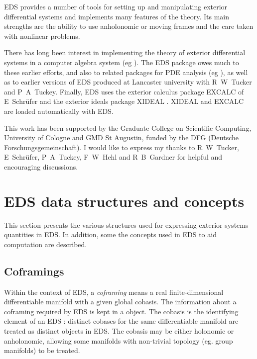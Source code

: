 EDS provides a number of tools for setting up and manipulating exterior
differential systems and implements many features of the theory. Its main
strengths are the ability to use anholonomic or moving frames and the care
taken with nonlinear problems.

There has long been interest in implementing the theory of exterior
differential systems in a computer algebra system (eg
\cite{Shapeev,Ganzha,HartleyTucker}). The EDS package owes much to these
earlier efforts, and also to related packages for PDE analysis (eg
\cite{MansfieldFackerell,Reid,Seiler}), as well as to earlier versions of
EDS produced at Lancaster university with R~W~Tucker and
P~A~Tuckey. Finally, EDS uses the exterior calculus package EXCALC of
E~Schr{\"u}fer \cite{EXCALC} and the exterior ideals package XIDEAL
\cite{XIDEAL}. XIDEAL and EXCALC are loaded automatically with EDS.

This work has been supported by the Graduate College on Scientific
Computing, University of Cologne and GMD St Augustin, funded by the DFG (Deutsche
Forschungsgemeinschaft). I would like to express my thanks to R~W~Tucker,
E~Schr{\"u}fer, P~A~Tuckey, F~W~Hehl and R~B~Gardner for helpful and
encouraging discussions.




\section{EDS data structures and concepts}
\label{EDS data structures and concepts}

This section presents the various structures used for expressing exterior
systems quantities in EDS. In addition, some the concepts used in EDS to
aid computation are described.

\subsection{Coframings}
\label{Coframings}

Within the context of EDS, a {\it coframing} means a real
finite-dimensional differentiable manifold with a given global cobasis.
The information about a coframing required by EDS is kept in a
 object. The cobasis is the identifying element of an
EDS : distinct cobases for the same differentiable
manifold are treated as distinct  objects in EDS. The
cobasis may be either holonomic or anholonomic, allowing some manifolds
with non-trivial topology (eg.  group manifolds) to be treated. 

